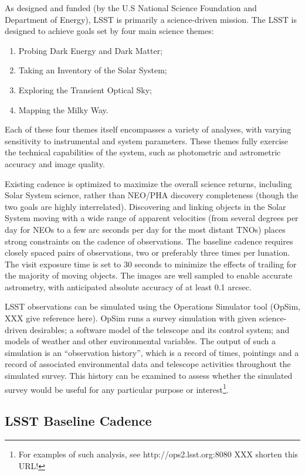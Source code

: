 As designed and funded (by the U.S National Science Foundation and
Department of Energy), LSST is primarily a science-driven mission. 
The LSST is designed to achieve goals set by four main science themes:
\begin{enumerate}
\item Probing Dark Energy and Dark Matter;
\item Taking an Inventory of the Solar System;
\item Exploring the Transient Optical Sky;
\item Mapping the Milky Way.
\end{enumerate}
Each of these four themes itself encompasses a variety of analyses, with 
varying sensitivity to instrumental and system parameters. These themes 
fully exercise the technical capabilities of the system, such as photometric 
and astrometric accuracy and image quality. 

Existing cadence is optimized to maximize the overall science returns, including 
Solar System science, rather than NEO/PHA discovery completeness (though the 
two goals are highly interrelated). Discovering and linking objects in the Solar System 
moving with a wide range of apparent velocities (from several degrees per day for 
NEOs to a few arc seconds per day for the most distant TNOs) places strong 
constraints on the cadence of observations. The baseline cadence requires closely 
spaced pairs of observations, two or preferably three times per lunation. The visit
exposure time is set to 30 seconds to minimize the effects of trailing for the majority of 
moving objects. The images are well sampled to enable accurate astrometry, with 
anticipated absolute accuracy of at least 0.1 arcsec.

LSST observations can be simulated using the Operations Simulator tool (OpSim, XXX give
reference here). OpSim runs a survey simulation with given science-driven desirables; 
a software model of the telescope and its control system; and models of weather and other 
environmental variables. The output of such a simulation is an ``observation history'', which 
is a record of times, pointings and a record of associated environmental data and telescope  
activities throughout the simulated  survey.  This history can be examined to assess  
whether the simulated survey would be useful for any particular purpose or 
interest\footnote{For examples of such analysis, see http://ops2.lsst.org:8080 XXX shorten this URL!}. 


\subsection{LSST Baseline Cadence}

